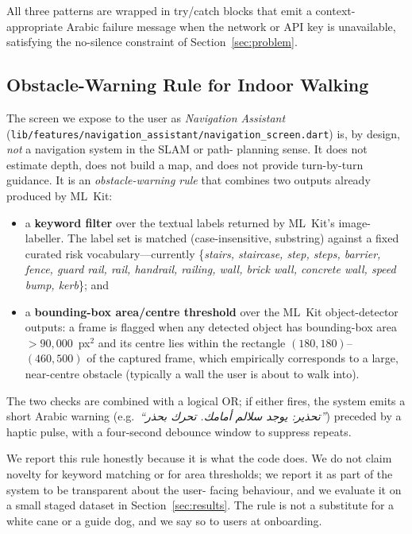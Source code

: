\documentclass[11pt,a4paper]{article}
\begin{document}
All three patterns are wrapped in try/catch blocks that emit a
context-appropriate Arabic failure message when the network or API key is
unavailable, satisfying the no-silence constraint of
Section~\ref{sec:problem}.

\subsection{Obstacle-Warning Rule for Indoor Walking}
\label{sec:nav_rule}

The screen we expose to the user as \emph{Navigation Assistant}
(\texttt{lib/features/navigation\_assistant/navigation\_screen.dart})
is, by design, \emph{not} a navigation system in the SLAM or path-
planning sense. It does not estimate depth, does not build a map, and
does not provide turn-by-turn guidance. It is an \emph{obstacle-warning
rule} that combines two outputs already produced by ML~Kit:

\begin{itemize}
\item a \textbf{keyword filter} over the textual labels returned by
ML~Kit's image-labeller. The label set is matched (case-insensitive,
substring) against a fixed curated risk vocabulary---currently
\{\emph{stairs, staircase, step, steps, barrier, fence, guard rail,
rail, handrail, railing, wall, brick wall, concrete wall, speed
bump, kerb}\}; and
\item a \textbf{bounding-box area/centre threshold} over the
ML~Kit object-detector outputs: a frame is flagged when any detected
object has bounding-box area $> 90{,}000$~px$^2$ and its centre
lies within the rectangle $(180,180)$--$(460,500)$ of the captured
frame, which empirically corresponds to a large, near-centre
obstacle (typically a wall the user is about to walk into).
\end{itemize}

The two checks are combined with a logical OR; if either fires, the
system emits a short Arabic warning (e.g.\ \emph{``تحذير: يوجد سلالم
أمامك. تحرك بحذر''}) preceded by a haptic pulse, with a four-second
debounce window to suppress repeats.

We report this rule honestly because it is what the code does. We do
not claim novelty for keyword matching or for area thresholds; we
report it as part of the system to be transparent about the user-
facing behaviour, and we evaluate it on a small staged dataset in
Section~\ref{sec:results}. The rule is not a substitute for a white
cane or a guide dog, and we say so to users at onboarding.
\end{document}

